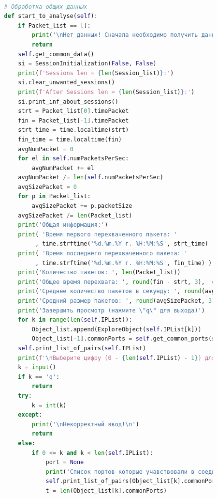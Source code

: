 \documentclass[bachelor, och, coursework]{SCWorks}
\begin{document}
\begin{lstlisting}[language=Python]
      
          # Обработка общих данных
          def start_to_analyse(self):
              if Packet_list == []:
                  print('\nНет данных! Сначала необходимо получить данные!\n')
                  return
              self.get_common_data()
              si = SessionInitialization(False, False)
              print(f'Sessions len = {len(Session_list)}:')
              si.clear_unwanted_sessions()
              print(f'After Sessions len = {len(Session_list)}:')
              si.print_inf_about_sessions()
              strt = Packet_list[0].timePacket
              fin = Packet_list[-1].timePacket
              strt_time = time.localtime(strt)
              fin_time = time.localtime(fin)
              avgNumPacket = 0
              for el in self.numPacketsPerSec:
                  avgNumPacket += el
              avgNumPacket /= len(self.numPacketsPerSec)
              avgSizePacket = 0
              for p in Packet_list:
                  avgSizePacket += p.packetSize
              avgSizePacket /= len(Packet_list)
              print('Общая информация:')
              print( 'Время первого перехваченного пакета: '
                   , time.strftime('%d.%m.%Y г. %H:%M:%S', strt_time) )
              print( 'Время последнего перехваченного пакета: '
                   , time.strftime('%d.%m.%Y г. %H:%M:%S', fin_time) )
              print('Количество пакетов: ', len(Packet_list))
              print('Общее время перехвата: ', round(fin - strt, 3), 'сек')
              print('Среднее количество пакетов в секунду: ', round(avgNumPacket, 3))
              print('Средний размер пакетов: ', round(avgSizePacket, 3))
              print('Завершить просмотр (нажмите \"q\" для выхода)')
              for k in range(len(self.IPList)):
                  Object_list.append(ExploreObject(self.IPList[k]))
                  Object_list[-1].commonPorts = self.get_common_ports(self.IPList[k])
              self.print_list_of_pairs(self.IPList)
              print(f'\nВыберите цифру (0 - {len(self.IPList) - 1}) для просмотра IP-адреса:')
              k = input()
              if k == 'q':
                  return
              try:
                  k = int(k)
              except:
                  print('\nНекорректный ввод!\n')
                  return
              else:
                  if 0 <= k and k < len(self.IPList):
                      port = None
                      print('Список портов которые учавствовали в соединении с данным IP-адресом')
                      self.print_list_of_pairs(Object_list[k].commonPorts, True)
                      t = len(Object_list[k].commonPorts)

\end{lstlisting}
\end{document}
